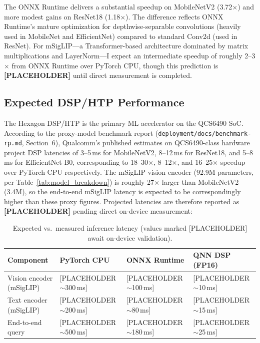 \documentclass[../main.tex]{subfiles}
\begin{document}
\noindent The ONNX Runtime delivers a substantial speedup on MobileNetV2 (3.72$\times$) and more modest gains on ResNet18 (1.18$\times$). The difference reflects ONNX Runtime's mature optimization for depthwise-separable convolutions (heavily used in MobileNet and EfficientNet) compared to standard Conv2d (used in ResNet). For mSigLIP---a Transformer-based architecture dominated by matrix multiplications and LayerNorm---I expect an intermediate speedup of roughly 2--3$\times$ from ONNX Runtime over PyTorch CPU, though this prediction is \textbf{[PLACEHOLDER]} until direct measurement is completed.

\subsection{Expected DSP/HTP Performance}

\noindent The Hexagon DSP/HTP is the primary ML accelerator on the QCS6490 SoC. According to the proxy-model benchmark report (\texttt{deployment/docs/benchmark-rp.md}, Section~6), Qualcomm's published estimates on QCS6490-class hardware project DSP latencies of 3--5\,ms for MobileNetV2, 8--12\,ms for ResNet18, and 5--8\,ms for EfficientNet-B0, corresponding to 18--30$\times$, 8--12$\times$, and 16--25$\times$ speedup over PyTorch CPU respectively. The mSigLIP vision encoder (92.9M parameters, per Table~\ref{tab:model_breakdown}) is roughly 27$\times$ larger than MobileNetV2 (3.4M), so the end-to-end mSigLIP latency is expected to be correspondingly higher than these proxy figures. Projected latencies are therefore reported as \textbf{[PLACEHOLDER]} pending direct on-device measurement:

\begin{table}[htbp]
\centering
\caption{Expected vs.\ measured inference latency (values marked [PLACEHOLDER] await on-device validation).}
\label{tab:expected_latency}
\renewcommand{\arraystretch}{1.3}
\begin{tabularx}{\textwidth}{XXXX}
\toprule
\textbf{Component} & \textbf{PyTorch CPU} & \textbf{ONNX Runtime} & \textbf{QNN DSP (FP16)} \\
\midrule
Vision encoder (mSigLIP) & [PLACEHOLDER $\sim$300\,ms] & [PLACEHOLDER $\sim$100\,ms] & [PLACEHOLDER $\sim$10\,ms] \\
Text encoder (mSigLIP)   & [PLACEHOLDER $\sim$200\,ms] & [PLACEHOLDER $\sim$80\,ms]  & [PLACEHOLDER $\sim$15\,ms] \\
End-to-end query         & [PLACEHOLDER $\sim$500\,ms] & [PLACEHOLDER $\sim$180\,ms] & [PLACEHOLDER $\sim$25\,ms] \\
\bottomrule
\end{tabularx}
\end{table}
\end{document}
